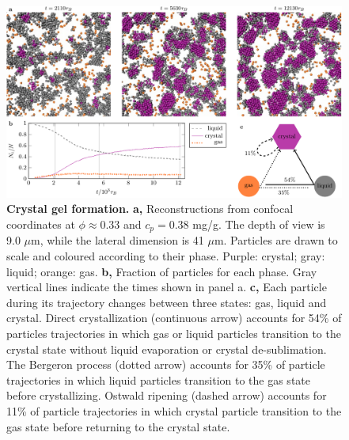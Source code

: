 \documentclass[preprint,amsmath,amssymb,superscriptaddress]{revtex4-1}
\begin{document}

\begin{figure}
 \centering
 \includegraphics[width=16cm]{transitions}
 \caption{{\bf Crystal gel formation.}  
{\bf a,} Reconstructions from confocal coordinates at $\phi\approx 0.33$ and $c_p=0.38$ mg/g. The depth of view is 9.0 $\mu$m, while the lateral dimension is 41 $\mu$m. Particles are drawn to scale and coloured according to their phase. Purple: crystal; gray: liquid; orange: gas.
{\bf b,} Fraction of particles for each phase. Gray vertical lines indicate the times shown in panel a. 
{\bf c,} Each particle during its trajectory changes between three states: gas, liquid and crystal. Direct crystallization (continuous arrow) accounts for 54\% of particles trajectories in which
gas or liquid particles transition to the crystal state without liquid evaporation or crystal de-sublimation. The Bergeron process (dotted arrow) accounts for 35\% of particle trajectories in which liquid particles
transition to the gas state before crystallizing. Ostwald ripening (dashed arrow) accounts for 11\% of particle trajectories in which crystal particle transition to the gas state before returning
to the crystal state.}
\label{fig:transitions}
\end{figure}
\end{document}
